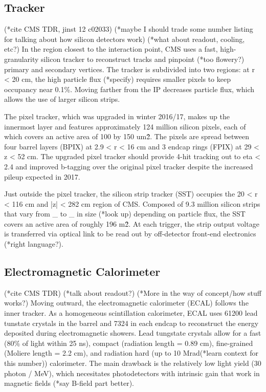 \documentclass[12pt]{article}
\begin{document}
\subsection{Tracker}
        (*cite CMS TDR, jinst 12 c02033)
        (*maybe I should trade some number listing for talking about how silicon detectors work)
        (*what about readout, cooling, etc?)
        In the region closest to the interaction point, CMS uses a fast, high-granularity silicon tracker to reconstruct tracks and pinpoint (*too flowery?) primary and secondary vertices. The tracker is subdivided into two regions: at r < 20 cm, the high particle flux (*specify) requires smaller pixels to keep occupancy near 0.1\%. Moving farther from the IP decreases particle flux, which allows the use of larger silicon strips.

        The pixel tracker, which was upgraded in winter 2016/17, makes up the innermost layer and features approximately 124 million silicon pixels, each of which covers an active area of 100 by 150 um\^2. The pixels are spread between four barrel layers (BPIX) at 2.9 < r < 16 cm and 3 endcap rings (FPIX) at 29 < z < 52 cm. The upgraded pixel tracker should provide 4-hit tracking out to eta < 2.4 and improved b-tagging over the original pixel tracker despite the increased pileup expected in 2017.
        
        Just outside the pixel tracker, the silicon strip tracker (SST) occupies the 20 < r < 116 cm and |z| < 282 cm region of CMS. Composed of 9.3 million silicon strips that vary from \_ to \_ in size (*look up) depending on particle flux, the SST covers an active area of roughly 196 m\^2. At each trigger, the strip output voltage is transferred via optical link to be read out by off-detector front-end electronics (*right language?).

\subsection{Electromagnetic Calorimeter}
        (*cite CMS TDR)
        (*talk about readout?)
        (*More in the way of concept/how stuff works?)
        Moving outward, the electromagnetic calorimeter (ECAL) follows the inner tracker. As a homogeneous scintillation calorimeter, ECAL uses 61200 lead tunstate crystals in the barrel and 7324 in each endcap to reconstruct the energy deposited during electromagnetic showers. Lead tungstate crystals allow for a fast (80\% of light within 25 ns), compact (radiation length = 0.89 cm), fine-grained (Moliere length = 2.2 cm), and radiation hard (up to 10 Mrad(*learn context for this number)) calorimeter. The main drawback is the relatively low light yield (30 photon / MeV), which necesitates photodetectors with intrinsic gain that work in magnetic fields (*say B-field part better). 
\end{document}

